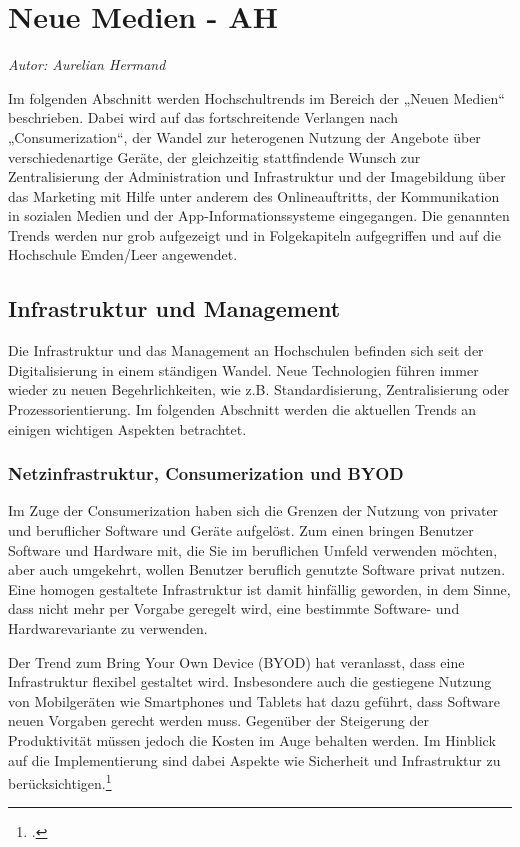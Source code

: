 \section{Neue Medien - AH}
\textit{Autor: Aurelian Hermand}

Im folgenden Abschnitt werden Hochschultrends im Bereich der „Neuen Medien“ beschrieben. Dabei wird auf das fortschreitende Verlangen nach „Consumerization“, der Wandel zur heterogenen Nutzung der Angebote über verschiedenartige Geräte, der gleichzeitig stattfindende Wunsch zur Zentralisierung der Administration und Infrastruktur und der Imagebildung über das Marketing mit Hilfe unter anderem des Onlineauftritts, der Kommunikation in sozialen Medien und der App-Informationssysteme eingegangen. Die genannten Trends werden nur grob aufgezeigt und in Folgekapiteln aufgegriffen und auf die Hochschule Emden/Leer angewendet.


\subsection{Infrastruktur und Management}
Die Infrastruktur und das Management an Hochschulen befinden sich seit der Digitalisierung in einem ständigen Wandel. Neue Technologien führen immer wieder zu neuen Begehrlichkeiten, wie z.B. Standardisierung, Zentralisierung oder Prozessorientierung. Im folgenden Abschnitt werden die aktuellen Trends an einigen wichtigen Aspekten betrachtet.


\subsubsection{Netzinfrastruktur, Consumerization und BYOD}
\label{netzinfrastruktur_consumerization_und_byod}
Im Zuge der Consumerization haben sich die Grenzen der Nutzung von privater und beruflicher Software und Geräte aufgelöst. Zum einen bringen Benutzer Software und Hardware mit, die Sie im beruflichen Umfeld verwenden möchten, aber auch umgekehrt, wollen Benutzer beruflich genutzte Software privat nutzen. Eine homogen gestaltete Infrastruktur ist damit hinfällig geworden, in dem Sinne, dass nicht mehr per Vorgabe geregelt wird, eine bestimmte Software- und Hardwarevariante zu verwenden.

Der Trend zum Bring Your Own Device (BYOD) hat veranlasst, dass eine Infrastruktur flexibel 
gestaltet wird. Insbesondere auch die gestiegene Nutzung von Mobilgeräten wie Smartphones 
und Tablets hat dazu geführt, dass Software neuen Vorgaben gerecht werden muss. Gegenüber 
der Steigerung der Produktivität müssen jedoch die Kosten im Auge behalten werden. Im 
Hinblick auf die Implementierung sind dabei Aspekte wie Sicherheit und Infrastruktur zu 
berücksichtigen.\footcite{forrester_research_2012}

